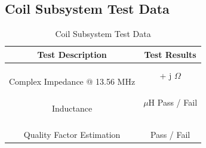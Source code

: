\documentclass[12pt]{article}
\begin{document}
\begin{appendices}
\subsection{Coil Subsystem Test Data}
\begin{table}[h!]
\centering
\caption*{Coil Subsystem Test Data}
\begin{tabular}{ | c | c | }
\hline
\textbf{Test Description} & \textbf{Test Results} \\
\hline
\parbox{0.5\linewidth}{\raggedright \hfill \\[-0.25 em]
Complex Impedance @ 13.56 MHz
\hfill \\[0.1 em]} &  \parbox{0.4\linewidth}{\raggedright \hfill \\ [0.7 em]\underline{\hspace{0.625in}} 
 + j
\underline{\hspace{0.625in}} 
$\Omega$
\hfill \\ [0.3 em]} \\ 
\hline
\parbox{0.5\linewidth}{\raggedright \hfill \\[-0.25 em]
Inductance
\hfill \\[0.1 em]} &  \parbox{0.4\linewidth}{\raggedright \hfill \\ [0.7 em]\underline{\hspace{0.625in}} 
$\mu$H
\hspace{0.125 in}Pass \space / \space  Fail \hfill \\ [0.3 em]} \\ 
\hline
\parbox{0.5\linewidth}{\raggedright \hfill \\[-0.25 em]
Quality Factor Estimation
\hfill \\[0.1 em]} &  \parbox{0.4\linewidth}{\raggedright \hfill \\ [0.7 em]\underline{\hspace{0.625in}} 
\hspace{0.125 in}Pass \space / \space  Fail \hfill \\ [0.3 em]} \\ 
\hline
\end{tabular}
\end{table}
\hfill


\end{appendices}
\end{document}
